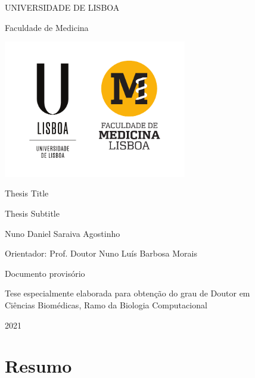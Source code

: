 \documentclass[12pt, twoside]{report}
\begin{document}
\begin{titlepage}
    \begin{center}
        \vspace*{-.2cm}
        UNIVERSIDADE DE LISBOA
        
        Faculdade de Medicina
        
        \includegraphics[width=0.6\textwidth]{images/logo/ulisboa}
        
        \vspace{1.8cm}
        Thesis Title
        
        \vspace{0.5cm}
        Thesis Subtitle
            
        \vspace{0.9cm}            
        Nuno Daniel Saraiva Agostinho
    \end{center}

    \vspace{0.9cm}
    Orientador: Prof. Doutor Nuno Luís Barbosa Morais
    
    \vspace{2.2cm}
    \begin{center}
        Documento provisório
        
        Tese especialmente elaborada para obtenção do grau de Doutor em\\
        Ciências Biomédicas, Ramo da Biologia Computacional
            
        \vfill
        2021
        \vspace{.7cm}    
    \end{center}
\end{titlepage}

\tableofcontents

\chapter*{Resumo}
\end{document}
